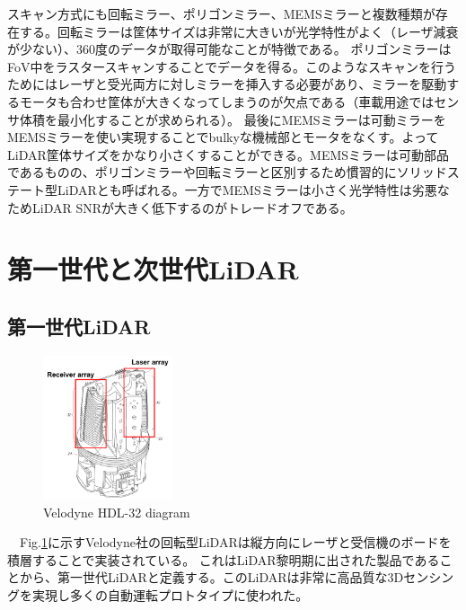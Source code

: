 \documentclass[twocolumn, 11pt, a4j]{article}
\begin{document}
スキャン方式にも回転ミラー\cite{velodyne,ouster}、ポリゴンミラー\cite{niclass2012100,yoshioka201820,kondo2020automotive}、MEMSミラー\cite{kumagai2021189x600}と複数種類が存在する。回転ミラーは筐体サイズは非常に大きいが光学特性がよく（レーザ減衰が少ない）、360度のデータが取得可能なことが特徴である。
ポリゴンミラーはFoV中をラスタースキャンすることでデータを得る。このようなスキャンを行うためにはレーザと受光両方に対しミラーを挿入する必要があり、ミラーを駆動するモータも合わせ筐体が大きくなってしまうのが欠点である（車載用途ではセンサ体積を最小化することが求められる）。
最後にMEMSミラーは可動ミラーをMEMSミラーを使い実現することでbulkyな機械部とモータをなくす。よってLiDAR筐体サイズをかなり小さくすることができる。MEMSミラーは可動部品であるものの、ポリゴンミラーや回転ミラーと区別するため慣習的にソリッドステート型LiDARとも呼ばれる。一方でMEMSミラーは小さく光学特性は劣悪なためLiDAR SNRが大きく低下するのがトレードオフである。

\section{第一世代と次世代LiDAR}
\subsection{第一世代LiDAR}
\begin{figure}[!t]
\centering
 \includegraphics[width=0.34\textwidth]{figs/velo.png}
  \caption{Velodyne HDL-32 diagram \cite{velopatent}}
\label{velo}
\end{figure}

　Fig.\ref{velo}に示すVelodyne社の回転型LiDAR\cite{velodyne, velopatent}は縦方向にレーザと受信機のボードを積層することで実装されている。
これはLiDAR黎明期に出された製品であることから、第一世代LiDARと定義する\cite{yoshiokaieice}。このLiDARは非常に高品質な3Dセンシングを実現し多くの自動運転プロトタイプに使われた\cite{montemerlo2008junior}。
\end{document}
